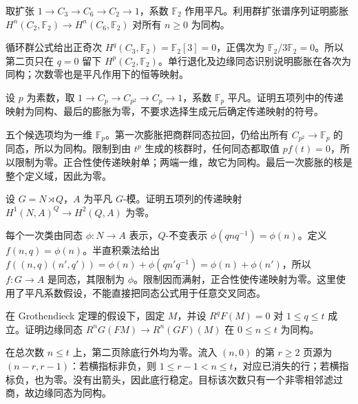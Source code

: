 \begin{exercise}\label{b4:ex:15-cyclic-coprime-kernel}
	取扩张 \(1\to C_3\to C_6\to C_2\to1\)，系数 \(\mathbb F_2\) 作用平凡。利用群扩张谱序列证明膨胀 \(H^n(C_2,\mathbb F_2)\to H^n(C_6,\mathbb F_2)\) 对所有 \(n\ge0\) 为同构。
\end{exercise}
\begin{solution}
	循环群公式给出正奇次 \(H^q(C_3,\mathbb F_2)=\mathbb F_2[3]=0\)，正偶次为 \(\mathbb F_2/3\mathbb F_2=0\)。所以第二页只在 \(q=0\) 留下 \(H^p(C_2,\mathbb F_2)\)。单行退化及边缘同态识别说明膨胀在各次为同构；次数零也是平凡作用下的恒等映射。
\end{solution}

\begin{exercise}\label{b4:ex:15-prime-square-transgression}
	设 \(p\) 为素数，取 \(1\to C_p\to C_{p^2}\to C_p\to1\)，系数 \(\mathbb F_p\) 平凡。证明五项列中的传递映射为同构、最后的膨胀为零，不要求选择生成元后确定传递映射的符号。
\end{exercise}
\begin{solution}
	五个候选项均为一维 \(\mathbb F_p\)。第一次膨胀把商群同态拉回，仍给出所有 \(C_{p^2}\to\mathbb F_p\) 的同态，所以为同构。限制到由 \(t^p\) 生成的核群时，任何同态都取值 \(pf(t)=0\)，所以限制为零。正合性使传递映射单；两端一维，故它为同构。最后一次膨胀的核是整个定义域，因此为零。
\end{solution}

\begin{exercise}\label{b4:ex:15-split-transgression}
	设 \(G=N\rtimes Q\)，\(A\) 为平凡 \(G\)-模。证明五项列的传递映射 \(H^1(N,A)^Q\to H^2(Q,A)\) 为零。
\end{exercise}
\begin{solution}
	每个一次类由同态 \(\phi:N\to A\) 表示，\(Q\)-不变表示 \(\phi(qnq^{-1})=\phi(n)\)。定义 \(f(n,q)=\phi(n)\)。半直积乘法给出 \(f((n,q)(n',q'))=\phi(n)+\phi(qn'q^{-1})=\phi(n)+\phi(n')\)，所以 \(f:G\to A\) 是同态，其限制为 \(\phi\)。限制因而满射，正合性使传递映射为零。这里使用了平凡系数假设，不能直接把同态公式用于任意交叉同态。
\end{solution}

\begin{exercise}\label{b4:ex:15-vanishing-range}
	在 Grothendieck 定理的假设下，固定 \(M\)，并设 \(R^qF(M)=0\) 对 \(1\le q\le t\) 成立。证明边缘同态 \(R^nG(FM)\to R^n(GF)(M)\) 在 \(0\le n\le t\) 为同构。
\end{exercise}
\begin{solution}
	在总次数 \(n\le t\) 上，第二页除底行外均为零。流入 \((n,0)\) 的第 \(r\ge2\) 页源为 \((n-r,r-1)\)：若横指标非负，则 \(1\le r-1<n\le t\)，对应已消失的行；若横指标负，也为零。没有出箭头，因此底行稳定。目标该次数只有一个非零相邻滤过商，故边缘同态为同构。
\end{solution}

